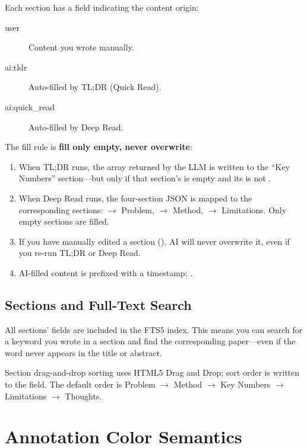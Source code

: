 Each section has a  field indicating the content origin:

\begin{description}
  \item[user] Content you wrote manually.
  \item[ai:tldr] Auto-filled by TL;DR (Quick Read).
  \item[ai:quick\_read] Auto-filled by Deep Read.
\end{description}

The fill rule is \textbf{fill only empty, never overwrite}:

\begin{enumerate}
  \item When TL;DR runs, the  array returned by the LLM is written
    to the ``Key Numbers'' section---but only if that section's  is empty
    and its  is not .
  \item When Deep Read runs, the four-section JSON is mapped to the corresponding
    sections:  $\to$ Problem,  $\to$ Method,
     $\to$ Limitations. Only empty sections are filled.
  \item If you have manually edited a section (), AI will never
    overwrite it, even if you re-run TL;DR or Deep Read.
  \item AI-filled content is prefixed with a timestamp: .
\end{enumerate}

\subsection{Sections and Full-Text Search}

All sections'  fields are included in the  FTS5 index.
This means you can search for a keyword you wrote in a section and find the
corresponding paper---even if the word never appears in the title or abstract.

\begin{tipbox}
Section drag-and-drop sorting uses HTML5 Drag and Drop; sort order is written to
the  field. The default order is Problem $\to$ Method $\to$ Key Numbers
$\to$ Limitations $\to$ Thoughts.
\end{tipbox}

\section{Annotation Color Semantics}

